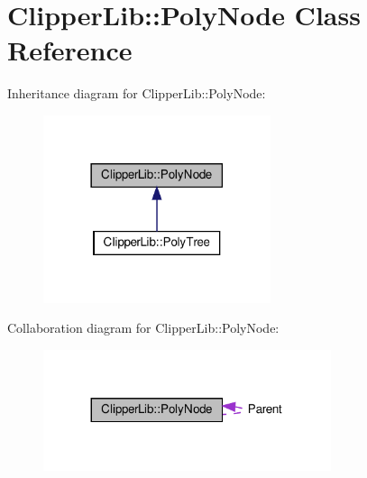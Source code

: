 \hypertarget{class_clipper_lib_1_1_poly_node}{}\section{Clipper\+Lib\+:\+:Poly\+Node Class Reference}
\label{class_clipper_lib_1_1_poly_node}


Inheritance diagram for Clipper\+Lib\+:\+:Poly\+Node\+:
\nopagebreak
\begin{figure}[H]
\begin{center}
\leavevmode
\includegraphics[width=189pt]{class_clipper_lib_1_1_poly_node__inherit__graph}
\end{center}
\end{figure}


Collaboration diagram for Clipper\+Lib\+:\+:Poly\+Node\+:
\nopagebreak
\begin{figure}[H]
\begin{center}
\leavevmode
\includegraphics[width=239pt]{class_clipper_lib_1_1_poly_node__coll__graph}
\end{center}
\end{figure}
